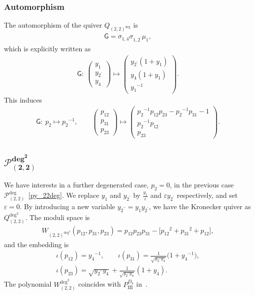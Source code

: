 \documentclass[10pt,a4paper]{amsart}
\numberwithin{equation}{section}
\begin{document}
\subsubsection*{Automorphism}
The automorphism of the quiver $Q_{(2,2)^{\text{deg}}}$ is
\begin{gather*}
 \mathsf{G} = \sigma_{1,4} \sigma_{1,2^\prime} \mu_1 ,
\end{gather*}
which is explicitly written as
\begin{gather*}
 \mathsf{G}\colon \
 \begin{pmatrix}
 y_1 \\ y_{2^\prime} \\ y_4
 \end{pmatrix}
 \mapsto
 \begin{pmatrix}
 y_{2^\prime} ( 1 + y_1) \\
 y_4 ( 1 + y_1) \\
 {y_1}^{-1}
 \end{pmatrix} .
\end{gather*}
This induces
\begin{gather*}
 \mathsf{G}\colon \
 p_2 \mapsto {p_2}^{-1} , \qquad
 \begin{pmatrix}
 p_{12} \\ p_{31} \\ p_{23}
 \end{pmatrix}
 \mapsto
 \begin{pmatrix}
 {p_2}^{-1} p_{12} p_{23} - {p_2}^{-1} p_{31} - 1 \\
 {p_2}^{-1} p_{12} \\
 p_{23}
 \end{pmatrix} .
\end{gather*}

\subsection[$\mathcal{P}_{(2,2)}^{\text{deg}^2}$]{$\boldsymbol{\mathcal{P}_{(2,2)}^{\text{deg}^2}}$}
We have interests in a further degenerated case, $p_2=0$, in the previous case $\mathcal{P}_{(2,2)}^{\text{deg}}$~\eqref{py_22deg}. We replace $y_1$ and $y_{2^\prime}$ by $\frac{y_1}{\varepsilon}$ and $\varepsilon y_{2^\prime}$ respectively, and set $\varepsilon=0$. By introducing a new variable $y_{2^{\prime\prime}}=y_1 y_{2^\prime}$, we have the Kronecker quiver as $Q_{(2,2)}^{\text{deg}^2}$. The moduli space is
\begin{gather*}
 W_{(2,2)^{\text{deg}^2}}( p_{12}, p_{31}, p_{23} ) = p_{12} p_{23} p_{31} - \big[ {p_{12}}^2 + {p_{31}}^2 +p_{12} \big] ,
\end{gather*}
and the embedding is
\begin{gather*}
 \iota(p_{12}) = {y_4}^{-1}, \qquad \iota(p_{31}) = \frac{1}{\sqrt{y_{2^{\prime\prime}} y_4}} \big( 1 + {y_4}^{-1} \big) , \\
\iota(p_{23}) = \sqrt{y_{2^{\prime\prime}} y_4} + \frac{1}{\sqrt{y_{2^{\prime\prime}} y_4}} ( 1 + y_4 ) .
\end{gather*}
The polynomial $W_{(2,2)}^{\text{deg}^2}$ coincides with $P_{\mathrm{III}}^{D_8}$ in~\cite{vdPutSaito09a}.
\end{document}
